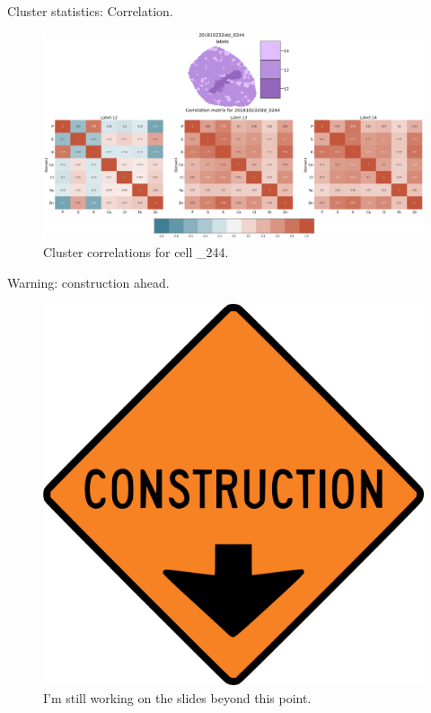 \documentclass[
]{beamer}
\begin{document}
\begin{frame}{Cluster statistics: Correlation.}
\begin{figure}
    \centering
    \includegraphics[width=1\textwidth,height=1\textheight,keepaspectratio]{Cluster_corr.png}
    \caption{Cluster correlations for cell \_244.}
    \label{fig:my_label}
\end{figure}
\end{frame}

\begin{frame}{Warning: construction ahead.}
\centering
\begin{figure}
\includegraphics[width=1\textwidth,height=.5\textheight,keepaspectratio]{construction.png}
\caption{I'm still working on the slides beyond this point.}
\end{figure}
\end{frame}
\end{document}
